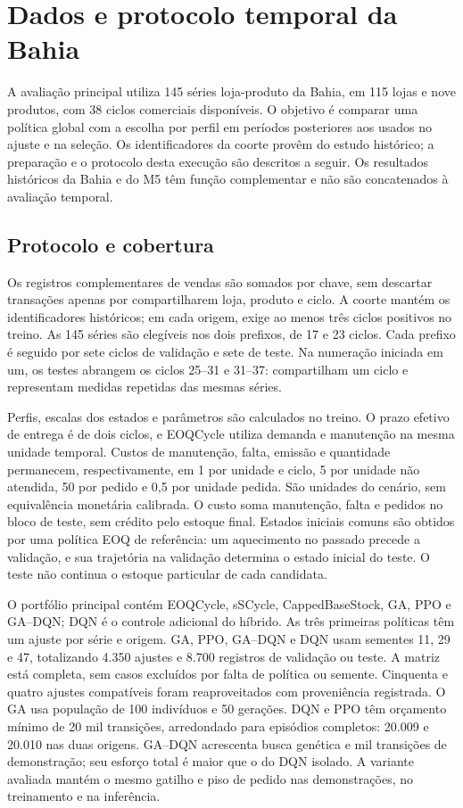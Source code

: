\section{Dados e protocolo temporal da Bahia}
\label{sec:ba2026_methods}

A avaliação principal utiliza 145 séries loja-produto da Bahia, em 115 lojas e nove produtos, com 38 ciclos comerciais disponíveis. O objetivo é comparar uma política global com a escolha por perfil em períodos posteriores aos usados no ajuste e na seleção. Os identificadores da coorte provêm do estudo histórico; a preparação e o protocolo desta execução são descritos a seguir. Os resultados históricos da Bahia e do M5 têm função complementar e não são concatenados à avaliação temporal.

\subsection{Protocolo e cobertura}

Os registros complementares de vendas são somados por chave, sem descartar transações apenas por compartilharem loja, produto e ciclo. A coorte mantém os identificadores históricos; em cada origem, exige ao menos três ciclos positivos no treino. As 145 séries são elegíveis nos dois prefixos, de 17 e 23 ciclos. Cada prefixo é seguido por sete ciclos de validação e sete de teste. Na numeração iniciada em um, os testes abrangem os ciclos 25--31 e 31--37: compartilham um ciclo e representam medidas repetidas das mesmas séries.

Perfis, escalas dos estados e parâmetros são calculados no treino. O prazo efetivo de entrega é de dois ciclos, e EOQCycle utiliza demanda e manutenção na mesma unidade temporal. Custos de manutenção, falta, emissão e quantidade permanecem, respectivamente, em 1 por unidade e ciclo, 5 por unidade não atendida, 50 por pedido e 0,5 por unidade pedida. São unidades do cenário, sem equivalência monetária calibrada. O custo soma manutenção, falta e pedidos no bloco de teste, sem crédito pelo estoque final. Estados iniciais comuns são obtidos por uma política EOQ de referência: um aquecimento no passado precede a validação, e sua trajetória na validação determina o estado inicial do teste. O teste não continua o estoque particular de cada candidata.

O portfólio principal contém EOQCycle, sSCycle, CappedBaseStock, GA, PPO e GA--DQN; DQN é o controle adicional do híbrido. As três primeiras políticas têm um ajuste por série e origem. GA, PPO, GA--DQN e DQN usam sementes 11, 29 e 47, totalizando 4.350 ajustes e 8.700 registros de validação ou teste. A matriz está completa, sem casos excluídos por falta de política ou semente. Cinquenta e quatro ajustes compatíveis foram reaproveitados com proveniência registrada. O GA usa população de 100 indivíduos e 50 gerações. DQN e PPO têm orçamento mínimo de 20 mil transições, arredondado para episódios completos: 20.009 e 20.010 nas duas origens. GA--DQN acrescenta busca genética e mil transições de demonstração; seu esforço total é maior que o do DQN isolado. A variante avaliada mantém o mesmo gatilho e piso de pedido nas demonstrações, no treinamento e na inferência.

